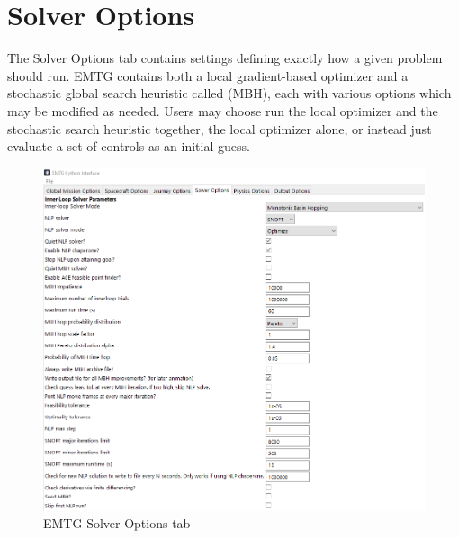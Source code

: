 \section{Solver Options}
\label{sec:solver_options}

The Solver Options tab contains settings defining exactly how a given problem should run. \ac{EMTG} contains both a local gradient-based optimizer and a stochastic global search heuristic called (\ac{MBH}), each with various options which may be modified as needed. Users may choose run the local optimizer and the stochastic search heuristic together, the local optimizer alone, or instead just evaluate a set of controls as an initial guess. 

\begin{figure}[H]
    \centering
    \includegraphics[width=1.0\textwidth]{../../shared_latex_inputs/images/pyemtg_solver_options_tab.png}
    \caption{EMTG Solver Options tab}
\end{figure}

